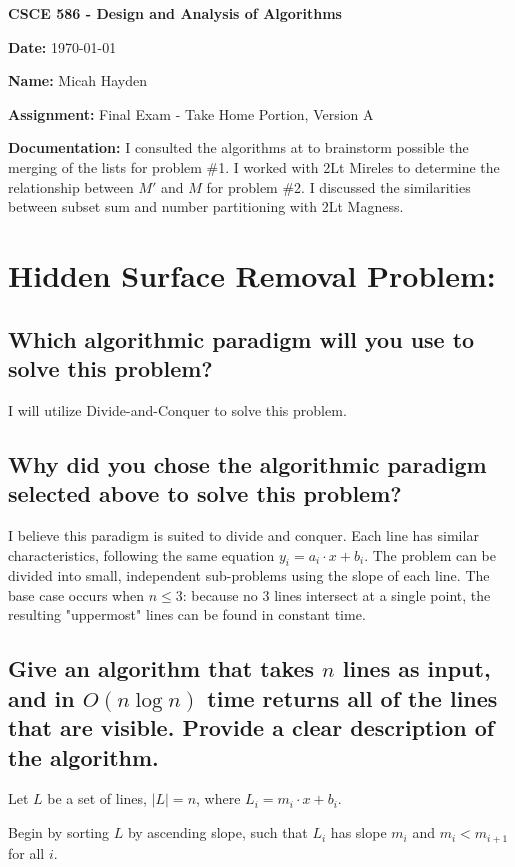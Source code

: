 \documentclass{article}
\begin{document}
\noindent \textbf{CSCE 586 - Design and Analysis of Algorithms}

\noindent \textbf{Date:}  \today 

\noindent \textbf{Name:}  Micah Hayden

\noindent \textbf{Assignment:}  Final Exam - Take Home Portion, Version A

\noindent \textbf{Documentation:} I consulted the algorithms at \cite{Git} to brainstorm possible the merging of the lists for problem \#1.  I worked with 2Lt Mireles to determine the relationship between $M'$ and $M$ for problem \#2.  I discussed the similarities between subset sum and number partitioning with 2Lt Magness.

\hrulefill

\section{Hidden Surface Removal Problem:}
\subsection{Which algorithmic paradigm will you use to solve this problem?}  
I will utilize Divide-and-Conquer to solve this problem.

\subsection{Why did you chose the algorithmic paradigm selected above to solve this problem?}
I believe this paradigm is suited to divide and conquer.  Each line has similar characteristics, following the same equation $y_i = a_i \cdot x + b_i$.  The problem can be divided into small, independent sub-problems using the slope of each line.  The base case occurs when $n \leq 3$:  because no 3 lines intersect at a single point, the resulting "uppermost" lines can be found in constant time.
 
\subsection{Give an algorithm that takes $n$ lines as input, and in $O(n \log{n})$ time returns all of the lines that are visible.  Provide a clear description of the algorithm.}

Let $L$ be a set of lines, $|L|=n$, where $L_i=m_i \cdot x + b_i$. \newline

\noindent Begin by sorting $L$ by ascending slope, such that $L_i$ has slope $m_i$ and $m_i < m_{i+1}$ for all $i$.
\end{document}
